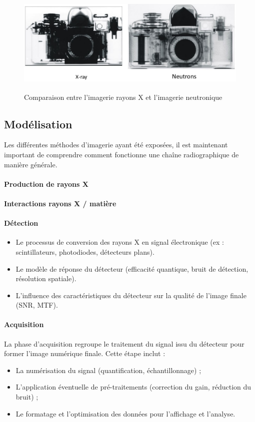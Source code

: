 \documentclass[12pt,a4paper]{report}
\begin{document}
\begin{figure}[H]
    \centering
    \includegraphics[height=5cm]{Assets/Imagerie_neutron_xray.png}
    \caption{Comparaison entre l'imagerie rayons X et l'imagerie neutronique}
    \label{fig:images}
\end{figure}

\subsection{Modélisation}
Les différentes méthodes d'imagerie ayant été exposées, il est maintenant important de comprendre comment fonctionne une chaîne radiographique de manière générale.

\paragraph{Production de rayons X}
\paragraph{Interactions rayons X / matière}
\paragraph{Détection}
\begin{itemize}
    \item Le processus de conversion des rayons X en signal électronique (ex : scintillateurs, photodiodes, détecteurs plans).
    \item Le modèle de réponse du détecteur (efficacité quantique, bruit de détection, résolution spatiale).
    \item L'influence des caractéristiques du détecteur sur la qualité de l'image finale (SNR, MTF).
\end{itemize}
\paragraph{Acquisition}
La phase d'acquisition regroupe le traitement du signal issu du détecteur pour former l'image numérique finale. Cette étape inclut :
\begin{itemize}
    \item La numérisation du signal (quantification, échantillonnage) ;
    \item L'application éventuelle de pré-traitements (correction du gain, réduction du bruit) ;
    \item Le formatage et l'optimisation des données pour l'affichage et l'analyse.
\end{itemize}
\end{document}

